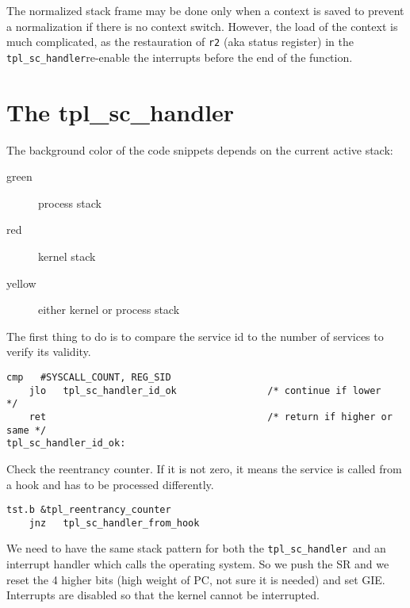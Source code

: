 \documentclass[11pt, oneside]{article}   	%
\newcommand{\sch}{\lstinline{tpl_sc_handler}}
\begin{document}
The normalized stack frame may be done only when a context is saved to prevent a normalization if there is no context switch. However, the load of the context is much complicated, as the restauration of \texttt{r2} (aka status register) in the \sch re-enable the interrupts before the end of the function.

\section{The tpl\_sc\_handler}

The background color of the code snippets depends on the current active stack:
\begin{description}
	\item[green] process stack
	\item[red]   kernel stack
	\item[yellow] either kernel or process stack
\end{description}


\vspace{1em}

The first thing to do is to compare the service id to the number of services to verify its validity.

\begin{lstlisting}[backgroundcolor=\color{yellow!15}]
    cmp   #SYSCALL_COUNT, REG_SID
    jlo   tpl_sc_handler_id_ok                /* continue if lower        */
    ret                                       /* return if higher or same */
tpl_sc_handler_id_ok:
\end{lstlisting}

Check the reentrancy counter. If it is not zero, it means the service is called from a hook and has to be processed differently.

\begin{lstlisting}[backgroundcolor=\color{yellow!15}]
    tst.b &tpl_reentrancy_counter
    jnz   tpl_sc_handler_from_hook
\end{lstlisting}


We need to have the same stack pattern for both the \sch\ and an interrupt handler which calls the operating system. So we push the SR and we reset the 4 higher bits (high weight of PC, not sure it is needed) and set GIE. Interrupts are disabled so that the kernel cannot be interrupted.
\end{document}
